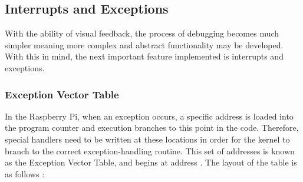 \subsection{Interrupts and Exceptions}
    With the ability of visual feedback, the process of debugging becomes much
    simpler meaning more complex and abstract functionality may be developed.
    With this in mind, the next important feature implemented is interrupts and
    exceptions.

    \subsubsection{Exception Vector Table}
        In the Raspberry Pi, when an exception occurs, a specific address is
        loaded into the program counter and execution branches to this point in
        the code.  Therefore, special handlers need to be written at these
        locations in order for the kernel to branch to the correct
        exception-handling routine. This set of addresses is known as the
        Exception Vector Table, and begins at address . The layout of
        the table is as follows \cite[pg.~A2-16]{ARMARM}:
